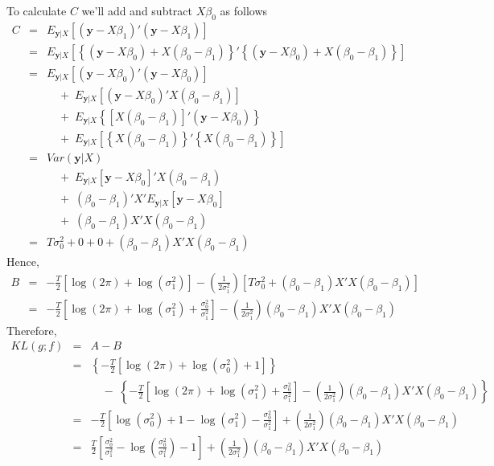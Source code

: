 \documentclass[12pt]{article}
\theoremstyle{definition}
\begin{document}
To calculate $C$ we'll add and subtract $X\beta_0$ as follows 
\begin{eqnarray*}
	C &=& E_{\mathbf{y}|X}\left[\left(\textbf{y} - X\beta_1\right)'\left(\textbf{y} -X\beta_1\right)\right]\\
		&=&E_{\mathbf{y}|X}\left[\left\{ \left(\mathbf{y} - X\beta_0\right) + X\left(\beta_0 - \beta_1\right)\right\}'\left\{ \left(\mathbf{y} - X\beta_0\right)+ X\left(\beta_0 - \beta_1\right)\right\} \right]\\ 
	&=& E_{\mathbf{y}|X}\left[\left(\mathbf{y} - X\beta_0\right)'\left(\mathbf{y} - X\beta_0\right)\right] \\
	&&\quad +\; E_{\mathbf{y}|X}\left[\left(\mathbf{y} -X\beta_0\right)'X\left(\beta_0 - \beta_1\right)\right] \\
	&& \quad +\;  E_{\mathbf{y}|X}\left\{\left[X\left(\beta_0 -\beta_1 \right) \right]'\left(\mathbf{y} - X\beta_0 \right)\right\} \\
	&& \quad + \;E_{\mathbf{y}|X}\left[\left\{X\left(\beta_0 - \beta_1\right)\right\}'\left\{X\left(\beta_0 - \beta_1\right)\right\} \right]\\ 
		&=& Var(\mathbf{y}|X)\\
		&&\quad +\; E_{\mathbf{y}|X}\left[\mathbf{y} - X\beta_0 \right]'X(\beta_0 -\beta_1) \\
		&& \quad + \;(\beta_0 -\beta_1)'X'E_{\mathbf{y}|X}\left[\mathbf{y} - X\beta_0 \right] \\
		&& \quad + \; (\beta_0 - \beta_1)X'X(\beta_0 - \beta_1)\\
	&=& T\sigma_0^2 + 0 + 0 + (\beta_0 - \beta_1)X'X(\beta_0 - \beta_1)
\end{eqnarray*}
Hence,
\begin{eqnarray*}
	B &=& -\frac{T}{2}\left[\log(2\pi) + \log(\sigma^2_1) \right] - \left(\frac{1}{2\sigma_1^2}\right) \left[ T\sigma_0^2 + (\beta_0 - \beta_1)X'X(\beta_0 - \beta_1)\right]\\
		&=& -\frac{T}{2}\left[\log(2\pi) + \log(\sigma^2_1) + \frac{\sigma_0^2}{\sigma_1^2}\right] - \left(\frac{1}{2\sigma_1^2} \right)(\beta_0 - \beta_1)X'X(\beta_0 - \beta_1)
\end{eqnarray*}
Therefore,
\begin{eqnarray*}
	KL(g;f) &=& A - B\\
		&=& \left\{ -\frac{T}{2}\left[ \log(2\pi) + \log(\sigma^2_0) +  1 \right]\right\}\\
		&& \quad - \; \left\{ -\frac{T}{2}\left[\log(2\pi) + \log(\sigma^2_1) + \frac{\sigma_0^2}{\sigma_1^2}\right] - \left(\frac{1}{2\sigma_1^2} \right)(\beta_0 - \beta_1)X'X(\beta_0 - \beta_1) \right\}\\
	&=& -\frac{T}{2} \left[ \log(\sigma_0^2) + 1 - \log(\sigma_1^2)  - \frac{\sigma_0^2}{\sigma_1^2}\right] + \left(\frac{1}{2\sigma_1^2} \right)(\beta_0 - \beta_1)X'X(\beta_0 - \beta_1)\\
	&=& \frac{T}{2}\left[\frac{\sigma_0^2}{\sigma_1^2}  - \log\left(\frac{\sigma_0^2}{\sigma_1^2} \right) - 1\right] + \left(\frac{1}{2\sigma_1^2} \right)(\beta_0 - \beta_1)X'X(\beta_0 - \beta_1)
\end{eqnarray*}
\end{document}
